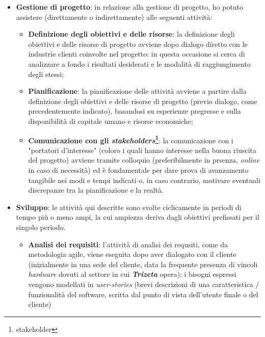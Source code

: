 \begin{itemize}
    \item \textbf{Gestione di progetto}: in relazione alla gestione di progetto, ho potuto assistere (direttamente o indirettamente) alle seguenti attività:
        \begin{itemize}
            \item \textbf{Definizione degli obiettivi e delle risorse}: la definizione degli obiettivi e delle risorse di progetto avviene dopo dialogo diretto con le industrie clienti coinvolte nel progetto: in questa occasione si cerca di analizzare a fondo 
                i risultati desiderati e le modalità di raggiungimento degli stessi;
            \item \textbf{Pianificazione}: la pianificazione delle attività avviene a partire dalla definizione degli obiettivi e delle risorse di progetto (previo dialogo, come precedentemente indicato), 
                basandosi su esperienze pregresse e sulla disponibilità di capitale umano e risorse economiche;
            \item \textbf{Comunicazione con gli \textit{stakeholders}\footnote{\gls{stakeholder}}}: la comunicazione con i "portatori d'interesse" (coloro i quali hanno interesse nella buona riuscita del progetto) avviene tramite colloquio (preferibilmente in prsenza, 
                \textit{online} in caso di necessità) ed è fondamentale per dare prova di avanzamento tangibile nei modi e tempi indicati o, in caso contrario, motivare eventuali discrepanze tra la pianificazione e la realtà.
        \end{itemize}
    \item \textbf{Sviluppo}: le attività qui descritte sono svolte ciclicamente in periodi di tempo più o meno ampi, la cui ampiezza deriva dagli obiettivi prefissati per il singolo periodo.
        \begin{itemize}
            \item \textbf{Analisi dei requisiti}: l'attività di analisi dei requsiti, come da metodologia agile, viene eseguita dopo aver dialogato con il cliente (inizialmente in una sede del cliente,
                data la frequente presenza di vincoli \textit{hardware} dovuti al settore in cui \textit{\textbf{Trizeta}} opera); i bisogni espressi vengono modellati in \textit{user-stories} (brevi descrizioni di una caratteristica / funzionalità del software, scritta dal punto di vista dell'utente finale o del cliente)

\end{itemize}
\end{itemize}
